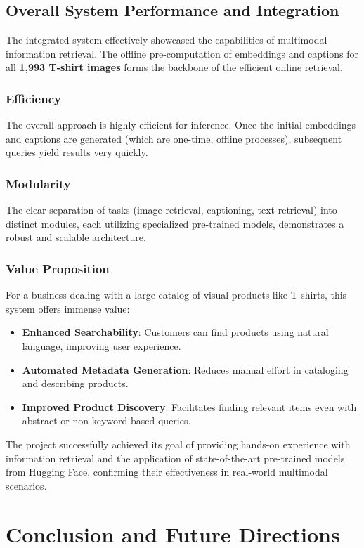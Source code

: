 \documentclass{article}
\begin{document}
\subsection{Overall System Performance and Integration}
The integrated system effectively showcased the capabilities of multimodal information retrieval. The offline pre-computation of embeddings and captions for all \textbf{1,993 T-shirt images} forms the backbone of the efficient online retrieval.

\subsubsection{Efficiency}
The overall approach is highly efficient for inference. Once the initial embeddings and captions are generated (which are one-time, offline processes), subsequent queries yield results very quickly.

\subsubsection{Modularity}
The clear separation of tasks (image retrieval, captioning, text retrieval) into distinct modules, each utilizing specialized pre-trained models, demonstrates a robust and scalable architecture.

\subsubsection{Value Proposition}
For a business dealing with a large catalog of visual products like T-shirts, this system offers immense value:
\begin{itemize}
    \item \textbf{Enhanced Searchability}: Customers can find products using natural language, improving user experience.
    \item \textbf{Automated Metadata Generation}: Reduces manual effort in cataloging and describing products.
    \item \textbf{Improved Product Discovery}: Facilitates finding relevant items even with abstract or non-keyword-based queries.
\end{itemize}
The project successfully achieved its goal of providing hands-on experience with information retrieval and the application of state-of-the-art pre-trained models from Hugging Face, confirming their effectiveness in real-world multimodal scenarios.

\section{Conclusion and Future Directions}
\label{sec:conclusion}
\end{document}
